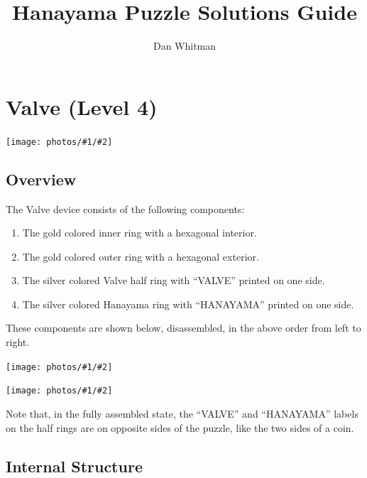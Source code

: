 \documentclass{article}
\newcommand{\photo}[3]{
      \begin{center}
            \texttt{[image: photos/\#1/\#2]}
      \end{center}
}
\begin{document}
\def\han{Hanayama}
\def\cc{counter-clockwise}

\title{\han{} Puzzle Solutions Guide}
\author{Dan Whitman}
\date{}

\maketitle

\section{Valve (Level 4)}

\newcommand{\valvediagram}[1]{
      \begin{center}
            \texttt{[image: \#1]}
      \end{center}
}
\def\vhalf{Valve half}
\def\hhalf{\han{} half}

\photo{valve}{puzzle}{1.5}

\subsection{Overview}

The Valve device consists of the following components:
\begin{enumerate}
      \item The gold colored inner ring with a hexagonal interior.
      \item The gold colored outer ring with a hexagonal exterior.
      \item The silver colored \vhalf{} ring with ``VALVE'' printed on one side.
      \item The silver colored \han{} ring with ``HANAYAMA'' printed on one side.
\end{enumerate}
These components are shown below, disassembled, in the above order from left to right.
\photo{valve}{components-top}{2.5}
\photo{valve}{components-angle}{2.5}
Note that, in the fully assembled state, the ``VALVE'' and ``HANAYAMA'' labels on the half rings are on opposite sides of the puzzle, like the two sides of a coin.

\subsection{Internal Structure} \label{sec:valve:struct}
\end{document}
